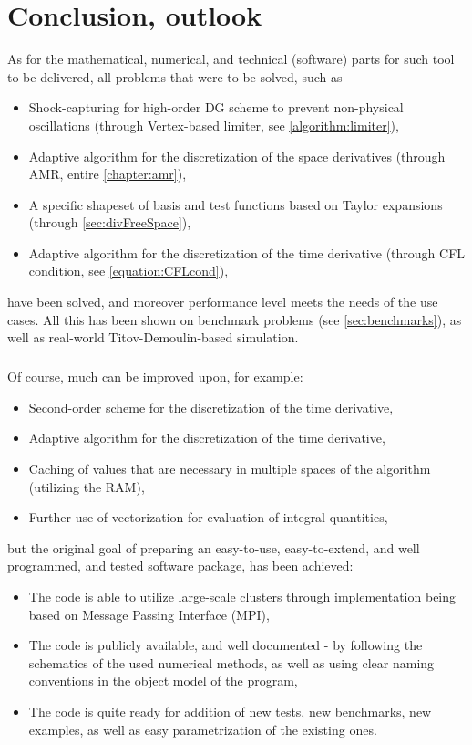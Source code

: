 \chapter{Conclusion, outlook}
As for the mathematical, numerical, and technical (software) parts for such tool to be delivered, all problems that were to be solved, such as
\begin{itemize}
	\item Shock-capturing for high-order DG scheme to prevent non-physical oscillations (through Vertex-based limiter, see \cref{algorithm:limiter}),
	\item Adaptive algorithm for the discretization of the space derivatives (through AMR, entire \cref{chapter:amr}),
	\item A specific shapeset of basis and test functions based on Taylor expansions (through \cref{sec:divFreeSpace}),
	\item Adaptive algorithm for the discretization of the time derivative (through CFL condition, see \cref{equation:CFLcond}),
\end{itemize}
have been solved, and moreover performance level meets the needs of the use cases. All this has been shown on benchmark problems (see \cref{sec:benchmarks}), as well as real-world Titov-Demoulin-based simulation.
\paragraph{}
Of course, much can be improved upon, for example:
\begin{itemize}
	\item Second-order scheme for the discretization of the time derivative,
	\item Adaptive algorithm for the discretization of the time derivative,
	\item Caching of values that are necessary in multiple spaces of the algorithm (utilizing the RAM),
	\item Further use of vectorization for evaluation of integral quantities,
\end{itemize}
but the original goal of preparing an easy-to-use, easy-to-extend, and well programmed, and tested software package, has been achieved:
\begin{itemize}
\item The code is able to utilize large-scale clusters through implementation being based on Message Passing Interface (MPI),
\item The code is publicly available, and well documented - by following the schematics of the used numerical methods, as well as using clear naming conventions in the object model of the program,
\item The code is quite ready for addition of new tests, new benchmarks, new examples, as well as easy parametrization of the existing ones.
\end{itemize}

